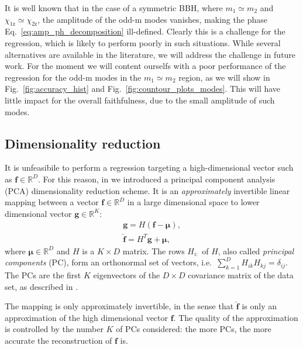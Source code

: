 \documentclass[twocolumn,showpacs,preprintnumbers,nofootinbib,prd,
superscriptaddress,10pt]{revtex4-2}
\newcommand{\R}{\mathbb{R}}
\begin{document}
It is well known \cite{Blackman:2015pia, Varma:2018mmi} that in the case of a symmetric BBH, where $m_1\simeq m_2$ and $\chi_\text{1z} \simeq \chi_\text{2z}$, the amplitude of the odd-m modes vanishes, making the phase Eq.~\eqref{eq:amp_ph_decomposition} ill-defined.
Clearly this is a challenge for the regression, which is likely to perform poorly in such situations.
While several alternatives are available in the literature, we will address the challenge in future work. For the moment we will content ourselfs with a poor performance of the regression for the odd-m modes in the $m_1\simeq m_2$ region, as we will show in Fig.~\ref{fig:accuracy_hist} and Fig.~\ref{fig:countour_plots_modes}. This will have little impact for the overall faithfulness, due to the small amplitude of such modes.

\subsection{Dimensionality reduction}
\label{sec:PCA}

It is unfeasibile to perform a regression targeting a high-dimensional vector such as $\boldsymbol{f} \in \R^D$. 
For this reason, in \cite{Schmidt:2020yuu} we introduced a principal component analysis (PCA) dimensionality 
reduction scheme.
It is an {\it approximately} invertible linear mapping between a vector $\boldsymbol{f} \in \R^D$ in a large dimensional space to lower dimensional vector  $\boldsymbol{g} \in \R^K$:
%
\begin{align}
	\mathbf{g} = H (\mathbf{f} - \boldsymbol{\mu}) \label{eq:PCA_reduction_model},\\
	\hat{\mathbf{f}} = H^T \mathbf{g} + \boldsymbol{\mu}, \label{eq:PCA_reconstruction_model}
\end{align}
where $\boldsymbol{\mu} \in \R^D$ and $H$ is a $K \times D$ matrix.
The rows $H_{i:}$ of $H$, also called {\it principal components} (PC), form an orthonormal set of vectors, 
i.e.~${\sum_{k=1}^D H_{ik} H_{kj} = \delta_{ij}}$.
The PCs are the first $K$ eigenvectors of the $D \times D$ covariance matrix of the data set, as described in 
\cite[Sec. 12]{murphy2012machine}.

The mapping is only approximately invertible, in the sense that $\hat{\mathbf{f}}$ is only an approximation of the high dimensional vector $\mathbf{f}$. The quality of the approximation is controlled by the number $K$ of PCs considered: the more PCs, the more accurate the reconstruction of $\mathbf{f}$ is.
\end{document}
